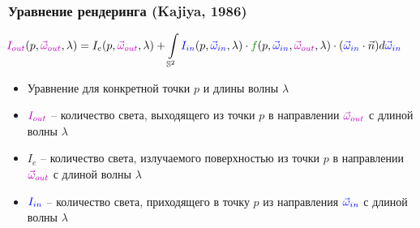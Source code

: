 \documentclass{beamer}
\begin{document}
\begin{frame}[fragile]
\frametitle{Уравнение рендеринга (Kajiya, 1986)}
\begin{equation*}
\hspace*{-0.5cm}
{\color{magenta}I_{out}}(p, {\color{magenta}\vec\omega_{out}}, \lambda) = I_{e}(p, {\color{magenta}\vec\omega_{out}}, \lambda)+\int\limits_{\mathbb S^2} {\color{blue}I_{in}}(p, {\color{blue}\vec\omega_{in}}, \lambda) \cdot {\color{green}f}(p, {\color{blue}\vec\omega_{in}}, {\color{magenta}\vec\omega_{out}}, \lambda) \cdot ({\color{blue}\vec\omega_{in}} \cdot \vec{n}) d{\color{blue}\vec\omega_{in}}
\end{equation*}
\pause
\begin{itemize}
\item Уравнение для конкретной точки \begin{math}p\end{math} и длины волны \begin{math}\lambda\end{math}
\pause
\item \begin{math}{\color{magenta}I_{out}}\end{math} -- количество света, выходящего из точки \begin{math}p\end{math} в направлении \begin{math}{\color{magenta}\vec\omega_{out}}\end{math} с длиной волны \begin{math}\lambda\end{math}
\pause
\item \begin{math}I_{e}\end{math} -- количество света, излучаемого поверхностью из точки \begin{math}p\end{math} в направлении \begin{math}{\color{magenta}\vec\omega_{out}}\end{math} с длиной волны \begin{math}\lambda\end{math}
\pause
\item \begin{math}{\color{blue}I_{in}}\end{math} -- количество света, приходящего в точку \begin{math}p\end{math} из направления \begin{math}{\color{blue}\vec\omega_{in}}\end{math} с длиной волны \begin{math}\lambda\end{math}

\end{itemize}
\end{frame}
\end{document}
